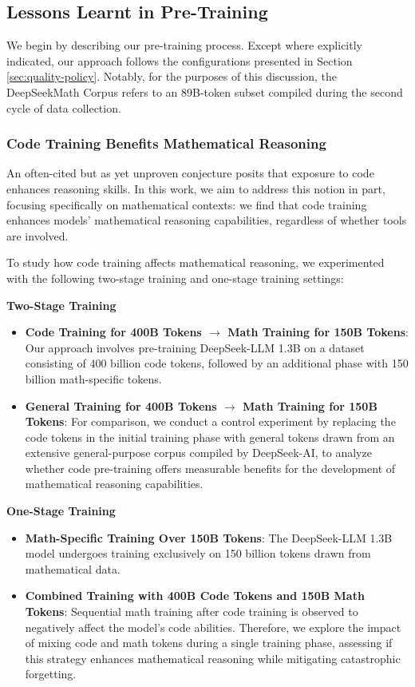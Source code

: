 \begin{itemize}[topsep=0pt]
\subsection{Lessons Learnt in Pre-Training}

We begin by describing our pre-training process. Except where explicitly indicated, our approach follows the configurations presented in Section \ref{sec:quality-policy}. Notably, for the purposes of this discussion, the DeepSeekMath Corpus refers to an 89B-token subset compiled during the second cycle of data collection.

\subsubsection{Code Training Benefits Mathematical Reasoning}

An often-cited but as yet unproven conjecture posits that exposure to code enhances reasoning skills. In this work, we aim to address this notion in part, focusing specifically on mathematical contexts: we find that code training enhances models' mathematical reasoning capabilities, regardless of whether tools are involved.

To study how code training affects mathematical reasoning, we experimented with the following two-stage training and one-stage training settings:

\textbf{Two-Stage Training}

\begin{itemize}[topsep=0pt]
    \item \textbf{Code Training for 400B Tokens $\rightarrow$ Math Training for 150B Tokens}: Our approach involves pre-training DeepSeek-LLM 1.3B on a dataset consisting of 400 billion code tokens, followed by an additional phase with 150 billion math-specific tokens.
    \item \textbf{General Training for 400B Tokens $\rightarrow$ Math Training for 150B Tokens}: For comparison, we conduct a control experiment by replacing the code tokens in the initial training phase with general tokens drawn from an extensive general-purpose corpus compiled by DeepSeek-AI, to analyze whether code pre-training offers measurable benefits for the development of mathematical reasoning capabilities.
\end{itemize}

\textbf{One-Stage Training}

\begin{itemize}[topsep=0pt]
    \item \textbf{Math-Specific Training Over 150B Tokens}: The DeepSeek-LLM 1.3B model undergoes training exclusively on 150 billion tokens drawn from mathematical data.
    \item \textbf{Combined Training with 400B Code Tokens and 150B Math Tokens}: Sequential math training after code training is observed to negatively affect the model's code abilities. Therefore, we explore the impact of mixing code and math tokens during a single training phase, assessing if this strategy enhances mathematical reasoning while mitigating catastrophic forgetting.
\end{itemize}


\end{itemize}
